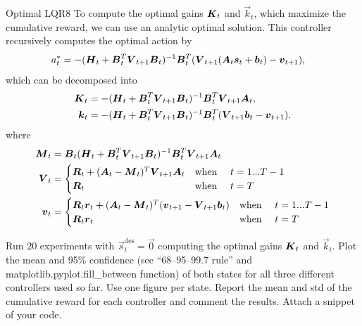 \begin{questions}
	
	
\begin{question}{Optimal LQR}{8}
	To compute the optimal gains ${\boldsymbol{K}}_t$ and $\vec k_t$, which maximize the cumulative reward, we can use an analytic optimal solution. This controller recursively computes the optimal action by
	\begin{align}
		a_t^* &= -({\boldsymbol{H}}_t + {\boldsymbol{B}}^T_t {\boldsymbol{V}}_{t+1}{\boldsymbol{B}}_t)^{-1}	{\boldsymbol{B}}^T_t ({\boldsymbol{V}}_{t+1} ({\boldsymbol{A}}_t {\boldsymbol{s}}_t+{\boldsymbol{b}}_t )- {\boldsymbol{v}}_{t+1} ),
	\end{align}
	which can be decomposed into
	\begin{align}
		{\boldsymbol{K}}_t &= -({\boldsymbol{H}}_t + {\boldsymbol{B}}^T_t {\boldsymbol{V}}_{t+1}{\boldsymbol{B}}_t)^{-1}	{\boldsymbol{B}}^T_t {\boldsymbol{V}}_{t+1} {\boldsymbol{A}}_t,
		\\
		{\boldsymbol{k}}_t &= -({\boldsymbol{H}}_t + {\boldsymbol{B}}^T_t {\boldsymbol{V}}_{t+1}{\boldsymbol{B}}_t)^{-1}	{\boldsymbol{B}}^T_t ({\boldsymbol{V}}_{t+1} {\boldsymbol{b}}_t - {\boldsymbol{v}}_{t+1}).
	\end{align}
	where
	\begin{align}
		{\boldsymbol{M}}_t &= {\boldsymbol{B}}_t({\boldsymbol{H}}_t + {\boldsymbol{B}}^T_t {\boldsymbol{V}}_{t+1}{\boldsymbol{B}}_t)^{-1}	{\boldsymbol{B}}^T_t {\boldsymbol{V}}_{t+1} {\boldsymbol{A}}_t
		\\
		{\boldsymbol{V}}_t &=
		\begin{cases}
	       {\boldsymbol{R}}_t + ({\boldsymbol{A}}_t - {\boldsymbol{M}}_t)^T{\boldsymbol{V}}_{t+1}{\boldsymbol{A}}_t & \text{when \quad} t = 1...T-1
	       \\
	       {\boldsymbol{R}}_t & \text{when \quad} t = T
	    \end{cases}
	    \\
		{\boldsymbol{v}}_t &= 
		\begin{cases}
	       {\boldsymbol{R}}_t{\boldsymbol{r}}_t + ({\boldsymbol{A}}_t - {\boldsymbol{M}}_t)^T({\boldsymbol{v}}_{t+1} - {\boldsymbol{V}}_{t+1}{\boldsymbol{b}}_t) & \text{when \quad} t = 1...T-1
	       \\
	       {\boldsymbol{R}}_t{\boldsymbol{r}}_t & \text{when \quad} t = T
	    \end{cases}
	\end{align}		 

	Run 20 experiments with $\vec s^\text{des}_t = \vec 0$ computing the optimal gains ${\boldsymbol{K}}_t$ and $\vec k_t$. Plot the mean and 95\% confidence (see ``68--95--99.7 rule'' and matplotlib.pyplot.fill\_between function) of both states for all three different controllers used so far. Use one figure per state. 
	Report the mean and std of the cumulative reward for each controller and comment the results. Attach a snippet of your code.


\end{question}
\end{questions}
